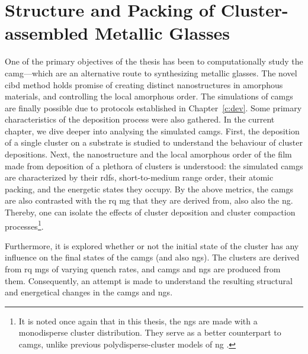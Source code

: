 \chapter{Structure and Packing of Cluster-assembled Metallic Glasses} \label{c:camg}
\scdeclaration

One of the primary objectives of the thesis has been to computationally study the \gls{camg}---which are an alternative route to synthesizing metallic glasses. The novel \gls{cibd} method holds promise of creating distinct nanostructures in amorphous materials, and controlling the local amorphous order. The simulations of \gls{camg}s are finally possible due to protocols established in Chapter~\ref{c:dev}. Some primary characteristics of the deposition process were also gathered. In the current chapter, we dive deeper into analysing the simulated \gls{camg}s. First, the deposition of a single cluster on a substrate is studied to understand the behaviour of cluster depositions. Next, the nanostructure and the local amorphous order of the film made from deposition of a plethora of clusters is understood: the simulated \gls{camg}s are characterized by their \gls{rdf}s, short-to-medium range order, their atomic packing, and the energetic states they occupy. By the above metrics, the \gls{camg}s are also contrasted with the \gls{rq} \gls{mg} that they are derived from, also also the \gls{ng}. Thereby, one can isolate the effects of cluster deposition and cluster compaction processes\footnote{It is noted once again that in this thesis, the \gls{ng}s are made with a monodisperse cluster distribution. They serve as a better counterpart to \gls{camg}s, unlike previous polydisperse-cluster models of \gls{ng} \cite{Adjaoud2018}.}. \par

Furthermore, it is explored whether or not the initial state of the cluster has any influence on the final states of the \gls{camg}s (and also \gls{ng}s). The clusters are derived from \gls{rq} \gls{mg}s of varying quench rates, and \gls{camg}s and \gls{ng}s are produced from them. Consequently, an attempt is made to understand the resulting structural and energetical changes in the \gls{camg}s and \gls{ng}s. \par

%
